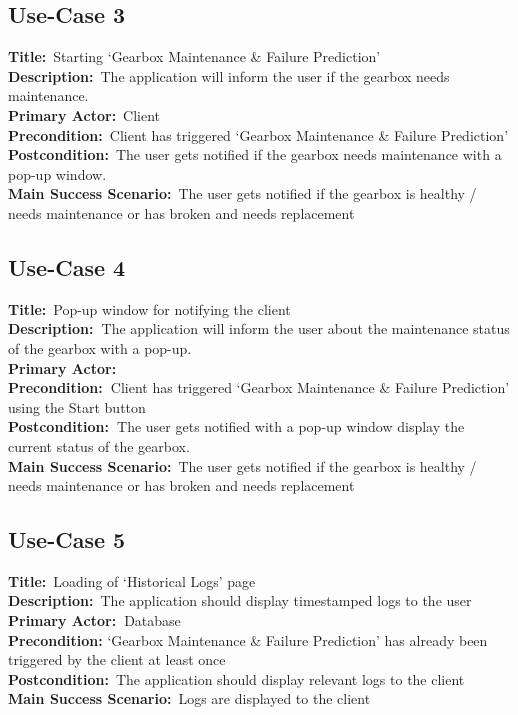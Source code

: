 \subsection{Use-Case 3}
\textbf{Title:} Starting ‘Gearbox Maintenance \& Failure Prediction’\\
\textbf{Description:} The application will inform the user if the gearbox needs maintenance.\\
\textbf{Primary Actor:} Client\\
\textbf{Precondition:} Client has triggered ‘Gearbox Maintenance \& Failure Prediction’\\
\textbf{Postcondition:} The user gets notified if the gearbox needs maintenance with a pop-up window.\\
\textbf{Main Success Scenario:} The user gets notified if the gearbox is healthy / needs maintenance or has broken and needs replacement\\
\subsection{Use-Case 4}
\textbf{Title:} Pop-up window for notifying the client\\
\textbf{Description: }The application will inform the user about the maintenance status of the gearbox with a pop-up. \\
\textbf{Primary Actor:} \\
\textbf{Precondition: }Client has triggered ‘Gearbox Maintenance \& Failure Prediction’ using the Start button\\
\textbf{Postcondition: }The user gets notified with a pop-up window display the current status of the gearbox.\\
\textbf{Main Success Scenario:} The user gets notified if the gearbox is healthy / needs maintenance or has broken and needs replacement\\
\subsection{Use-Case 5}
\textbf{Title:} Loading of ‘Historical Logs’ page\\
\textbf{Description:} The application should display timestamped logs to the user\\
\textbf{Primary Actor: }Database\\
\textbf{Precondition:} ‘Gearbox Maintenance \& Failure Prediction’ has already been triggered by the client at least once \\
\textbf{Postcondition:} The application should display relevant logs to the client \\
\textbf{Main Success Scenario:} Logs are displayed to the client \\
